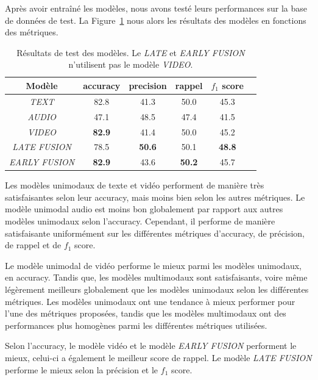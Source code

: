 Après avoir entraîné les modèles, nous avons testé leurs performances sur la base de données de test.
La Figure~\ref{tab: test} nous alors les résultats des modèles en fonctions des métriques.

\begin{table}
    \centering
    \begin{tabular}{|c|c|c|c|c|c|}
        \hline
        Modèle & accuracy & precision & rappel & $f_1$ score\\
        \hline
        \textit{TEXT} & 82.8 & 41.3 & 50.0 & 45.3\\
        \hline
        \textit{AUDIO} & 47.1 & 48.5 & 47.4 & 41.5\\
        \hline
        \textit{VIDEO} & \textbf{82.9} & 41.4 & 50.0 & 45.2\\
        \hline
        \textit{LATE FUSION} & 78.5 & \textbf{50.6} & 50.1 & \textbf{48.8}\\
        \hline
        \textit{EARLY FUSION} & \textbf{82.9} & 43.6 & \textbf{50.2} & 45.7\\
        \hline
    \end{tabular}
    \caption{Résultats de test des modèles. Le \textit{LATE} et \textit{EARLY FUSION} n'utilisent pas le modèle \textit{VIDEO}.}
    \label{tab: test}
\end{table}

Les modèles unimodaux de texte et vidéo performent de manière très satisfaisantes selon leur accuracy, mais moins bien selon les autres métriques.
Le modèle unimodal audio est moins bon globalement par rapport aux autres modèles unimodaux selon l'accuracy. 
Cependant, il performe de manière satisfaisante uniformément sur les différentes métriques d'accuracy, de précision, de rappel et de $f_1$ score. 

Le modèle unimodal de vidéo performe le mieux parmi les modèles unimodaux, en accuracy. Tandis que, les modèles multimodaux sont satisfaisants, voire même légèrement meilleurs globalement que les modèles unimodaux selon les différentes métriques. 
Les modèles unimodaux ont une tendance à mieux performer pour l'une des métriques proposées, tandis que les modèles multimodaux ont des performances plus homogènes parmi les différentes métriques utilisées. 

Selon l'accuracy, le modèle vidéo et le modèle \textit{EARLY FUSION} performent le mieux, celui-ci a également le meilleur score de rappel. Le modèle \textit{LATE FUSION} performe le mieux selon la précision et le $f_1$ score.